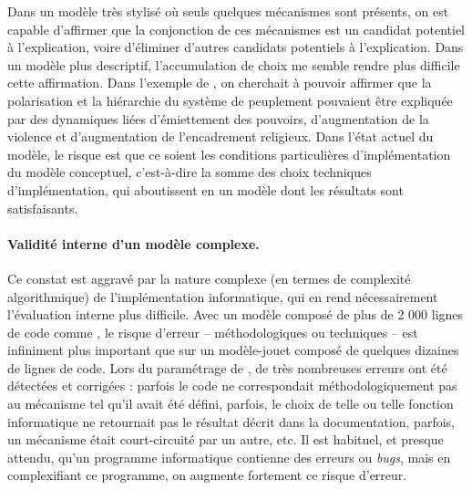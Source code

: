 Dans un modèle très stylisé où seuls quelques mécanismes sont présents, on est capable d'affirmer que la conjonction de ces mécanismes est un candidat potentiel à l'explication, voire d'éliminer d'autres candidats potentiels à l'explication.
Dans un modèle plus descriptif, l'accumulation de choix me semble rendre plus difficile cette affirmation.
Dans l'exemple de \simfeodal{}, on cherchait à pouvoir affirmer que la polarisation et la hiérarchie du système de peuplement pouvaient être expliquée par des dynamiques liées d'émiettement des pouvoirs, d'augmentation de la violence et d'augmentation de l'encadrement religieux.
Dans l'état actuel du modèle, le risque est que ce soient les conditions particulières d'implémentation du modèle conceptuel, c'est-à-dire la somme des choix techniques d'implémentation, qui aboutissent en un modèle dont les résultats sont satisfaisants.

\paragraph{Validité interne d'un modèle complexe.}
Ce constat est aggravé par la nature complexe (en termes de complexité algorithmique) de l'implémentation informatique, qui en rend nécessairement l'évaluation interne plus difficile.
Avec un modèle composé de plus de 2 000 lignes de code comme \simfeodal{}, le risque d'erreur -- méthodologiques ou techniques -- est infiniment plus important que sur un modèle-jouet composé de quelques dizaines de lignes de code.
Lors du paramétrage de \simfeodal{}, de très nombreuses erreurs ont été détectées et corrigées : parfois le code ne correspondait méthodologiquement pas au mécanisme tel qu'il avait été défini, parfois, le choix de telle ou telle fonction informatique ne retournait pas le résultat décrit dans la documentation, parfois, un mécanisme était court-circuité par un autre, etc.
Il est habituel, et presque attendu, qu'un programme informatique contienne des erreurs ou \textit{bugs}, mais en complexifiant ce programme, on augmente fortement ce risque d'erreur.

